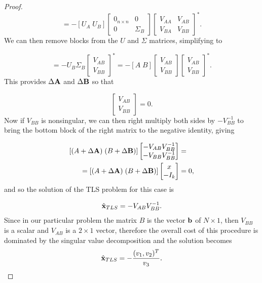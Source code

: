 \begin{proof}
\begin{equation}
[\dA\; \dB] = -[U_A\; U_B] \begin{bmatrix}0_{n\times n} &0 \\ 0 & \Sigma_B\end{bmatrix}\begin{bmatrix}V_{AA} & V_{AB} \\ V_{BA} & V_{BB}\end{bmatrix}^* .
\end{equation}
We can then remove blocks from the $U$ and $\Sigma$ matrices, simplifying to

\begin{equation}
[\dA\; \dB] = -U_B\Sigma_B \begin{bmatrix}V_{AB}\\V_{BB}\end{bmatrix}^*= -[A\; B] \begin{bmatrix}V_{AB}\\V_{BB}\end{bmatrix}\begin{bmatrix}V_{AB}\\ V_{BB}\end{bmatrix}^*.
\end{equation}
This provides $\Delta \mathbf{A}$ and $\Delta \mathbf{B}$ so that

\begin{equation}
[(A+\dA) \; (B+\dB)] \begin{bmatrix}V_{AB}\\ V_{BB}\end{bmatrix} = 0.
\end{equation}
Now if $V_{BB}$ is nonsingular, we can then right multiply both sides by $-V_{BB}^{-1}$ to bring the bottom block of the right matrix to the negative identity, giving

\begin{align}
\nonumber [(A+\Delta \mathbf{A}) \; (B+\Delta \mathbf{B})] \begin{bmatrix} -V_{AB} V_{BB}^{-1} \\ -V_{BB} V_{BB}^{-1}\end{bmatrix} &= \\ 
= [(A+\Delta \mathbf{A}) \; (B+\Delta \mathbf{B})] \begin{bmatrix} x\\ -I_k\end{bmatrix} &=  0 ,
\end{align}
and so the solution of the TLS problem for this case is

\begin{equation}
\hat{\mathbf{x}}_{TLS} =-V_{AB} V_{BB}^{-1}.
\end{equation}
Since in our particular problem the matrix $B$ is the vector $\mathbf{b}$ of $N \times 1$, then $V_{BB}$ is a scalar and $V_{AB}$ is a $2 \times 1$ vector, therefore the overall cost of this procedure is dominated by the singular value decomposition and the solution becomes
\begin{equation}
	\hat{\mathbf{x}}_{TLS} = -\frac{(v_1, v_2)^T}{v_3}.
\end{equation}
\end{proof}

